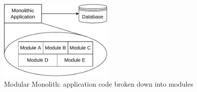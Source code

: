 \begin{figure}[!htbp]
    \centering
    \includegraphics[width=0.50\textwidth]{img/diagrams/pdf/modular-monolith.drawio.pdf}
    \caption[Modular Monolith]{Modular Monolith: application code broken down into modules \parencite{newman2019monolith}}
    \label{fig:modular-monolith}
\end{figure}
